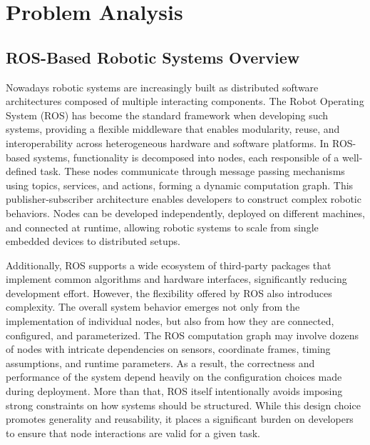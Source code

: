 \chapter{Problem Analysis}
\section{ROS-Based Robotic Systems Overview}
Nowadays robotic systems are increasingly built as distributed software architectures composed of multiple interacting components.
The Robot Operating System (ROS) has become the standard framework when developing such systems, providing a flexible middleware
that enables modularity, reuse, and interoperability across heterogeneous hardware and software platforms. In ROS-based systems,
functionality is decomposed into nodes, each responsible of a well-defined task. These nodes communicate through message passing mechanisms using topics, services, and actions, forming a 
dynamic computation graph. This publisher-subscriber architecture enables developers to construct complex robotic behaviors. Nodes can be developed independently, deployed on different machines, and connected at runtime,
allowing robotic systems to scale from single embedded devices to distributed setups.

Additionally, ROS supports a wide ecosystem of third-party packages that implement common algorithms and hardware interfaces,
significantly reducing development effort. However, the flexibility offered by ROS also introduces complexity. The overall system
behavior emerges not only from the implementation of individual nodes, but also from how they are connected, configured, and parameterized.
The ROS computation graph may involve dozens of nodes with intricate dependencies on sensors, coordinate frames, timing assumptions, and
runtime parameters. As a result, the correctness and performance of the system depend heavily on the configuration choices made during deployment.
More than that, ROS itself intentionally avoids imposing strong constraints on how systems should be structured. While this design choice promotes
generality and reusability, it places a significant burden on developers to ensure that node interactions are valid for a given task.

